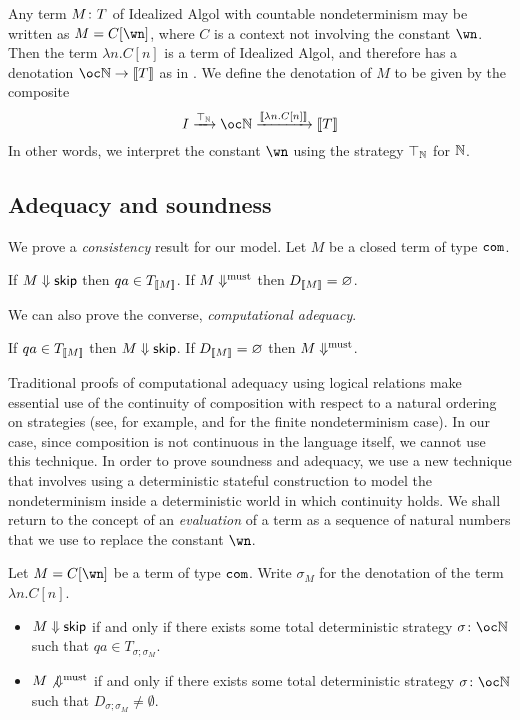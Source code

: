 \documentclass[sigplan,10pt,review]{acmart}\settopmatter{printfolios=true,printccs=false,printacmref=false}
\begin{document}
Any term $M\colon T$ of Idealized Algol with countable nondeterminism may be written as $M = C[\wn]$, where $C$ is a context not involving the constant $\wn$.  
Then the term $\lambda n.C[n]$ is a term of Idealized Algol, and therefore has a denotation $\oc\bN \to \deno{T}$ as in \cite{SamsonGuyIAPassive}.
We define the denotation of $M$ to be given by the composite
\[
  I \xrightarrow{\top_{\bN}}
  \oc \bN \xrightarrow{\deno{\lambda n.C[n]}}
  \deno{T}
  \]
In other words, we interpret the constant $\wn$ using the strategy $\top_{\mathbb{N}}$ for $\mathbb{N}$.

\subsection{Adequacy and soundness}

We prove a \emph{consistency} result for our model.  
Let $M$ be a closed term of type ${\mathtt{com}}$.

\begin{lemma}
  If $M\Downarrow{\mathsf{skip}}$ then $qa\in T_{\left\llbracket M\right\rrbracket}$.  
  If $M\Downarrow^{\text{must}}$ then $D_{\left\llbracket M\right\rrbracket}=\varnothing$.
  \label{lem:consistency}
\end{lemma}

We can also prove the converse, \emph{computational adequacy}.

\begin{proposition}
  If $qa\in T_{\left\llbracket M\right\rrbracket}$ then $M\Downarrow{\mathsf{skip}}$.
  If $D_{\left\llbracket M\right\rrbracket}=\varnothing$ then $M\Downarrow^{\text{must}}$.
  \label{prop:adequacy}
\end{proposition}

Traditional proofs of computational adequacy using logical relations make essential use of the continuity of composition with respect to a natural ordering on strategies (see, for example, \cite{mcCHFiniteND} and \cite{RusssThesis} for the finite nondeterminism case).  
In our case, since composition is not continuous in the language itself, we cannot use this technique.
In order to prove soundness and adequacy, we use a new technique that involves using a deterministic stateful construction to model the nondeterminism inside a deterministic world in which continuity holds.  
We shall return to the concept of an \emph{evaluation} of a term as a sequence of natural numbers that we use to replace the constant $\wn$.  

\begin{lemma}
  Let $M=C[\wn]$ be a term of type ${\mathtt{com}}$.  
  Write $\sigma_M$ for the denotation of the term $\lambda n.C[n]$.  
  \begin{itemize}
    \item $M\Downarrow{\mathsf{skip}}$ if and only if there exists some total deterministic strategy $\sigma\from\oc\bN$ such that $qa\in T_{\sigma;\sigma_M}$.
    \item $M\not{\Downarrow^{\text{must}}}$ if and only if there exists some total deterministic strategy $\sigma\from\oc\bN$ such that $D_{\sigma;\sigma_M}\ne\emptyset$.
  \end{itemize}
  \label{lem:soundness-lemma}
\end{lemma}
\end{document}
